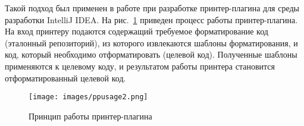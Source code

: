 
Такой подход был применен в работе \cite{paper:while} при разработке принтер-плагина для среды разработки IntelliJ IDEA. %
На рис.~\ref{intro:howto} приведен процесс работы принтер-плагина. 
На вход принтеру подаются содержащий требуемое форматирование код (эталонный репозиторий), из которого извлекаются шаблоны форматирования, и код, который необходимо отформатировать (целевой код).
Полученные шаблоны применяются к целевому коду, и результатом работы принтера становится отформатированный целевой код.


\begin{figure}
    \centering
    \texttt{[image: images/ppusage2.png]}
    \caption{Принцип работы принтер-плагина}
    \label{intro:howto}

\end{figure}


